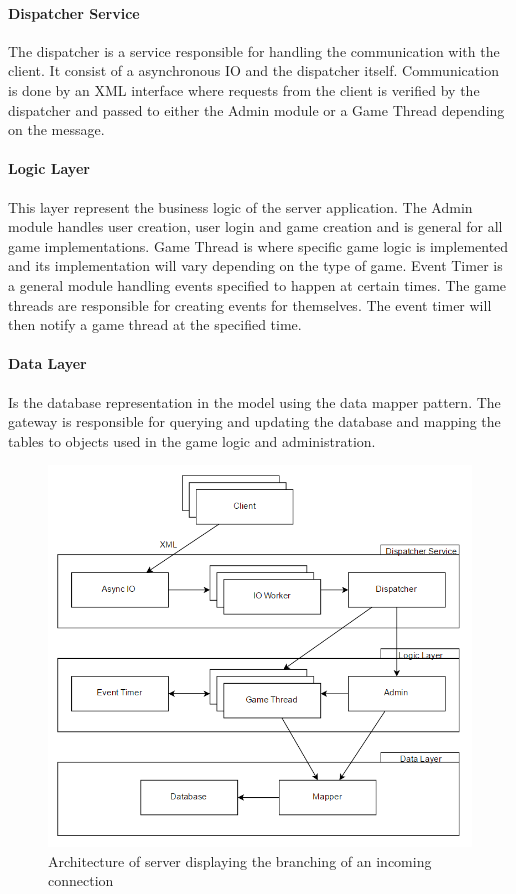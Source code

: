 \paragraph{Dispatcher Service}
The dispatcher is a service responsible for handling the communication with the client. It consist of a asynchronous IO and the dispatcher itself. Communication is done by an XML interface where requests from the client is verified by the dispatcher and passed to either the Admin module or a Game Thread depending on the message. 

\paragraph{Logic Layer}
This layer represent the business logic of the server application. The Admin module handles user creation, user login and game creation and is general for all game implementations. Game Thread is where specific game logic is implemented and its implementation will vary depending on the type of game. Event Timer is a general module handling events specified to happen at certain times. The game threads are responsible for creating events for themselves. The event timer will then notify a game thread at the specified time.

\paragraph{Data Layer}
Is the database representation in the model using the data mapper pattern. The gateway is responsible for querying and updating the database and mapping the tables to objects used in the game logic and administration.

\begin{figure}[H]
  \centering
  \includegraphics[width=\textwidth]{billeder/serverarch.png}  
  \caption{Architecture of server displaying the branching of an incoming connection}
  \label{fig:serverarch}
\end{figure}